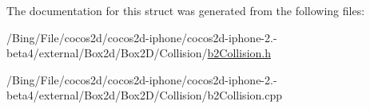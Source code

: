 The documentation for this struct was generated from the following files\-:\begin{DoxyCompactItemize}
\item 
/\-Bing/\-File/cocos2d/cocos2d-\/iphone/cocos2d-\/iphone-\/2.-\/beta4/external/\-Box2d/\-Box2\-D/\-Collision/\hyperlink{b2_collision_8h}{b2\-Collision.\-h}\item 
/\-Bing/\-File/cocos2d/cocos2d-\/iphone/cocos2d-\/iphone-\/2.-\/beta4/external/\-Box2d/\-Box2\-D/\-Collision/b2\-Collision.\-cpp\end{DoxyCompactItemize}

